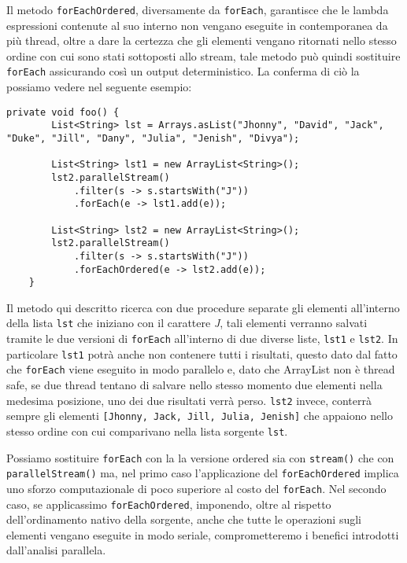 			Il metodo \lstinline|forEachOrdered|, diversamente da \lstinline|forEach|, garantisce che le lambda espressioni contenute al suo interno non vengano eseguite in contemporanea da più thread, oltre a dare la certezza che gli elementi vengano ritornati nello stesso ordine con cui sono stati sottoposti allo stream, tale metodo può quindi sostituire \lstinline|forEach| assicurando così un output deterministico. La conferma di ciò la possiamo vedere nel seguente esempio:
			\begin{lstlisting}[breaklines=true]
	private void foo() {
		List<String> lst = Arrays.asList("Jhonny", "David", "Jack", "Duke", "Jill", "Dany", "Julia", "Jenish", "Divya");
	
		List<String> lst1 = new ArrayList<String>();
		lst2.parallelStream()
			.filter(s -> s.startsWith("J"))
			.forEach(e -> lst1.add(e));
			
		List<String> lst2 = new ArrayList<String>();
		lst2.parallelStream()
			.filter(s -> s.startsWith("J"))
			.forEachOrdered(e -> lst2.add(e));
	}
			\end{lstlisting}
			Il metodo qui descritto ricerca con due procedure separate gli elementi all'interno della lista \lstinline|lst| che iniziano con il carattere \textit{J}, tali elementi verranno salvati tramite le due versioni di \lstinline|forEach| all'interno di due diverse liste, \lstinline|lst1| e \lstinline|lst2|. In particolare \lstinline|lst1| potrà anche non contenere tutti i risultati, questo dato dal fatto che \lstinline|forEach| viene eseguito in modo parallelo e, dato che ArrayList non è thread safe, se due thread tentano di salvare nello stesso momento due elementi nella medesima posizione, uno dei due risultati verrà perso. \lstinline|lst2| invece, conterrà sempre gli elementi \lstinline|[Jhonny, Jack, Jill, Julia, Jenish]| che appaiono nello stesso ordine con cui comparivano nella lista sorgente \lstinline|lst|.
			
			Possiamo sostituire \lstinline|forEach| con la la versione ordered sia con \lstinline|stream()| che con \lstinline|parallelStream()| ma, nel primo caso l'applicazione del \lstinline|forEachOrdered| implica uno sforzo computazionale di poco superiore al costo del \lstinline|forEach|. Nel secondo caso, se applicassimo \lstinline|forEachOrdered|, imponendo, oltre al rispetto dell'ordinamento nativo della sorgente, anche che tutte le operazioni sugli elementi vengano eseguite in modo seriale, comprometteremo i benefici introdotti dall'analisi parallela. 
			
